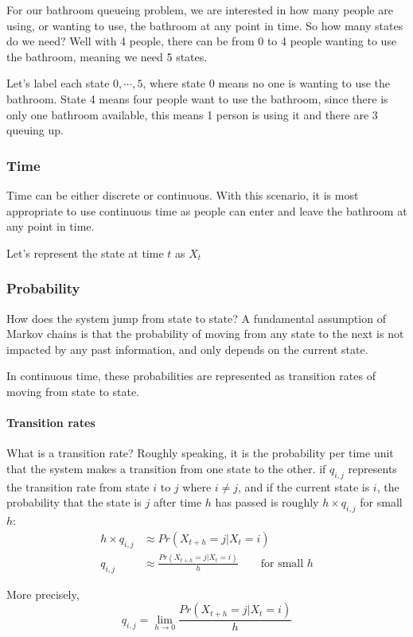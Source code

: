 For our bathroom queueing problem, we are interested in how many people are using, or wanting to use, the bathroom at any point in time. So how many states do we need? Well with 4 people, there can be from 0 to 4 people wanting to use the bathroom, meaning we need 5 states. 

Let's label each state $0, \cdots, 5$, where state 0 means no one is wanting to use the bathroom. State 4 means four people want to use the bathroom, since there is only one bathroom available, this means 1 person is using it and there are 3 queuing up.

\subsubsection*{Time}
Time can be either discrete or continuous. With this scenario, it is most appropriate to use continuous time as people can enter and leave the bathroom at any point in time.

Let's represent the state at time $t$ as $X_t$

\subsubsection*{Probability}
How does the system jump from state to state? A fundamental assumption of Markov chains is that the probability of moving from any state to the next is not impacted by any past information, and only depends on the current state.

In continuous time, these probabilities are represented as transition rates of moving from state to state.

\paragraph{Transition rates}
What is a transition rate? Roughly speaking, it is the probability per time unit that the system makes a transition from one state to the other. 
if $q_{i,j}$ represents the transition rate from state $i$ to $j$ where $i\neq j$, and if the current state is $i$, the probability that the state is $j$ after time $h$ has passed is roughly $h\times q_{i,j}$ for small $h$:
\begin{align*}
h\times q_{i,j} &\approx Pr(X_{t+h} = j|X_t = i)\\
q_{i, j} &\approx \frac{Pr(X_{t+h} = j|X_t = i)}{h} \qquad \text{for small } h
\end{align*}


More precisely,
$$ q_{i,j} = \lim_{h\rightarrow0}\frac{Pr(X_{t+h} = j | X_t = i)}{h} $$

